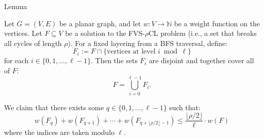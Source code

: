 \begin{mydefinition}{Lemma}
    \label{lemma:boundary_weight_bound_rho}
    
    Let \( G = (V, E) \) be a planar graph, and let \( w : V \rightarrow \mathbb{N} \) be a weight function on the vertices.  
    Let \( F \subseteq V \) be a solution to the FVS-\(\rho\)CL problem (i.e., a set that breaks all cycles of length \( \rho \)).  
    For a fixed layering from a BFS traversal, define:
    \[
    F_i := F \cap \{ \text{vertices at level } i \bmod \ell \}
    \]
    for each \( i \in \{0, 1, \ldots, \ell - 1\} \). Then the sets \( F_i \) are disjoint and together cover all of \( F \):
    \[
    F = \bigcup_{i=0}^{\ell - 1} F_i\text{.}
    \]
    
    We claim that there exists some \( q \in \{0, 1, \ldots, \ell - 1\} \) such that:
    \[
    w(F_q) + w(F_{q+1}) + \cdots + w(F_{q + \lfloor \rho/2 \rfloor - 1}) \leq \frac{\lfloor \rho/2 \rfloor}{\ell} \cdot w(F)
    \]
    where the indices are taken modulo \( \ell \).
\end{mydefinition}

